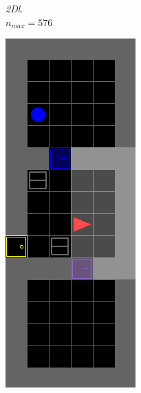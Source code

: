 \documentclass{article}
\begin{document}
\begin{figure}[H]
\begin{subfigure}[b]{0.6\linewidth}
\begin{subfigure}[b]{0.32\linewidth}
    \caption{\textit{2Dl}.
    \\ \(n_{max}=576 \)}
  \end{subfigure}
  \hfill
  \begin{subfigure}[b]{0.32\linewidth}
    \centering
    \includegraphics[width=\linewidth]{Tasks/ObstructedMaze/2Dlh}

\end{subfigure}
\end{subfigure}
\end{figure}
\end{document}
